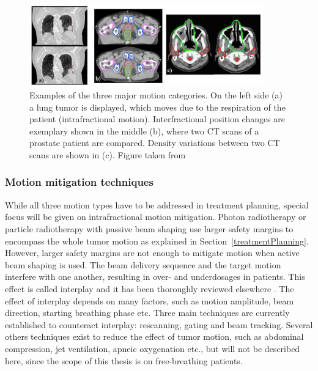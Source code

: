 \begin{figure}[H]
\begin{center}
\includegraphics[width=0.9\textwidth]{./Fundamentals/Images/motion_examples.png}
\caption{Examples of the three major motion categories. On the left side (a) a lung tumor is displayed, which moves due to the respiration 
of the patient (intrafractional motion). Interfractional position changes are exemplary shown in the middle (b), where two CT scans of a 
prostate patient are compared. Density variations between two CT scans are shown in (c). Figure taken from \cite{Engelsman2011}}
\label{motion}
\end{center}
\end{figure}

\subsubsection{Motion mitigation techniques}

While all three motion types have to be addressed in treatment planning, special focus will be given on intrafractional motion mitigation. Photon radiotherapy or particle radiotherapy with passive beam shaping 
use larger safety margins to encompass the whole tumor motion as explained in Section~\ref{treatmentPlanning}. However, larger safety margins are not enough to mitigate motion when active beam shaping is used. The beam delivery 
sequence and the target motion interfere with one another, resulting in over- and underdosages in patients. This effect is called interplay and it has been thoroughly reviewed elsewhere \cite{Phillips1992,Bert2008}. The effect of interplay depends
on many factors, such as motion amplitude, beam direction, starting breathing phase etc. Three main techniques are currently established to counteract interplay: rescanning, gating and beam tracking. Several others techniques exist
to reduce the effect of tumor motion, such as abdominal compression, jet ventilation, apneic oxygenation etc., but will not be described here, since the scope of this thesis is on free-breathing patients.


